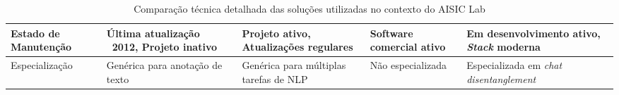 \begin{table}[p]
\begin{minipage}{\textwidth}
\begin{adjustbox}{width=\textwidth,center}
\begin{tabular}{|l|p{3.5cm}|p{3.5cm}|p{3.5cm}|p{3.5cm}|}
\hline
Estado de Manutenção & Última atualização ~2012, Projeto inativo & Projeto ativo, Atualizações regulares & Software comercial ativo & Em desenvolvimento ativo, \textit{Stack} moderna \\
\hline
Especialização & Genérica para anotação de texto & Genérica para múltiplas tarefas de NLP & Não especializada & Especializada em \textit{chat disentanglement} \\
\hline
\end{tabular}
\end{adjustbox}
\caption{Comparação técnica detalhada das soluções utilizadas no contexto do AISIC Lab}
\label{tab:tech-comparison}

\end{minipage}
\end{table}

